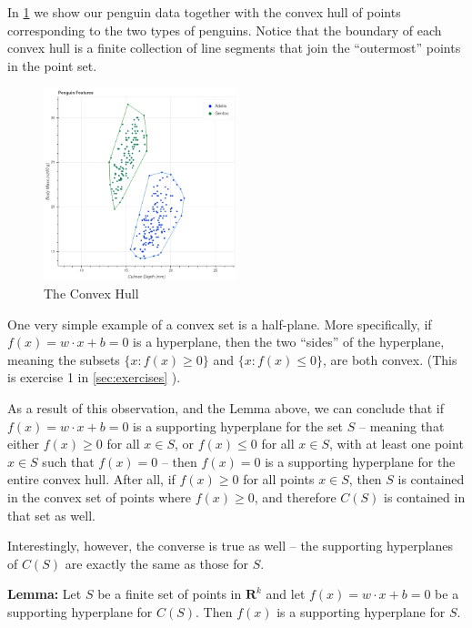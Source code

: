 \documentclass[
  oneside]{scrbook}
\begin{document}
In \cref{fig:convexhull} we show our penguin data together with the
convex hull of points corresponding to the two types of penguins. Notice
that the boundary of each convex hull is a finite collection of line
segments that join the ``outermost'' points in the point set.

\begin{figure}
\hypertarget{fig:convexhull}{%
\centering
\includegraphics[width=0.5\textwidth,height=\textheight]{img/penguinswithhulls.png}
\caption{The Convex Hull}\label{fig:convexhull}
}
\end{figure}

One very simple example of a convex set is a half-plane. More
specifically, if \(f(x)=w\cdot x+b=0\) is a hyperplane, then the two
``sides'' of the hyperplane, meaning the subsets \(\{x: f(x)\ge 0\}\)
and \(\{x: f(x)\le 0\}\), are both convex. (This is exercise 1 in
\cref{sec:exercises} ).

As a result of this observation, and the Lemma above, we can conclude
that if \(f(x)=w\cdot x+b=0\) is a supporting hyperplane for the set
\(S\) -- meaning that either \(f(x)\ge 0\) for all \(x\in S\), or
\(f(x)\le 0\) for all \(x\in S\), with at least one point \(x\in S\)
such that \(f(x)=0\) -- then \(f(x)=0\) is a supporting hyperplane for
the entire convex hull. After all, if \(f(x)\ge 0\) for all points
\(x\in S\), then \(S\) is contained in the convex set of points where
\(f(x)\ge 0\), and therefore \(C(S)\) is contained in that set as well.

Interestingly, however, the converse is true as well -- the supporting
hyperplanes of \(C(S)\) are exactly the same as those for \(S\).

\textbf{Lemma:} Let \(S\) be a finite set of points in
\(\mathbf{R}^{k}\) and let \(f(x)=w\cdot x +b=0\) be a supporting
hyperplane for \(C(S)\). Then \(f(x)\) is a supporting hyperplane for
\(S\).
\end{document}

